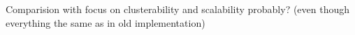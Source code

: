 \documentclass[../main.tex]{subfiles}
\begin{document}
Comparision with focus on clusterability and scalability probably? (even though everything the same as in old implementation)
\end{document}
